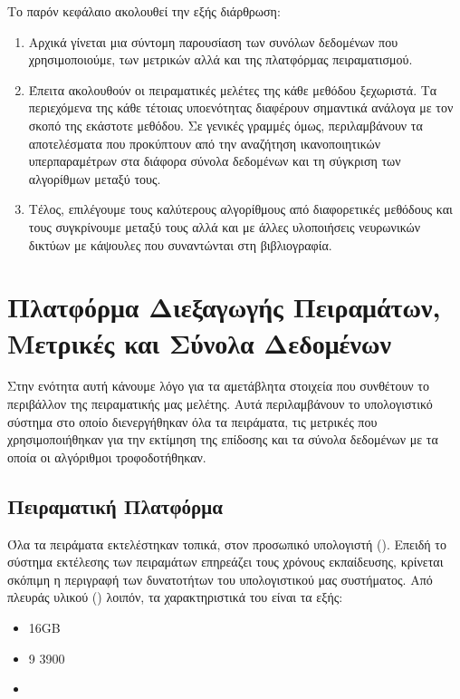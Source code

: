 Το παρόν κεφάλαιο ακολουθεί την εξής διάρθρωση:
\begin{enumerate}
    \item Αρχικά γίνεται μια σύντομη παρουσίαση των συνόλων δεδομένων που χρησιμοποιούμε, των μετρικών αλλά και της πλατφόρμας πειραματισμού.
    \item Έπειτα ακολουθούν οι πειραματικές μελέτες της κάθε μεθόδου ξεχωριστά. Τα περιεχόμενα της κάθε τέτοιας υποενότητας διαφέρουν σημαντικά ανάλογα με τον σκοπό της εκάστοτε μεθόδου. Σε γενικές γραμμές όμως, περιλαμβάνουν τα αποτελέσματα που προκύπτουν από την αναζήτηση ικανοποιητικών υπερπαραμέτρων στα διάφορα σύνολα δεδομένων και τη σύγκριση των αλγορίθμων μεταξύ τους.
    \item Τέλος, επιλέγουμε τους καλύτερους αλγορίθμους από διαφορετικές μεθόδους και τους συγκρίνουμε μεταξύ τους αλλά και με άλλες υλοποιήσεις νευρωνικών δικτύων με κάψουλες που συναντώνται στη βιβλιογραφία.
\end{enumerate}

\section{Πλατφόρμα Διεξαγωγής Πειραμάτων, Μετρικές και Σύνολα Δεδομένων} 
Στην ενότητα αυτή κάνουμε λόγο για τα αμετάβλητα στοιχεία που συνθέτουν το περιβάλλον της πειραματικής μας μελέτης. Αυτά περιλαμβάνουν το υπολογιστικό σύστημα στο οποίο διενεργήθηκαν όλα τα πειράματα, τις μετρικές που χρησιμοποιήθηκαν για την εκτίμηση της επίδοσης και τα σύνολα δεδομένων με τα οποία οι αλγόριθμοι τροφοδοτήθηκαν.
\subsection{Πειραματική Πλατφόρμα}
Όλα τα πειράματα εκτελέστηκαν τοπικά, στον προσωπικό υπολογιστή (). Επειδή το σύστημα εκτέλεσης των πειραμάτων επηρεάζει τους χρόνους εκπαίδευσης, κρίνεται σκόπιμη η περιγραφή των δυνατοτήτων του υπολογιστικού μας συστήματος. Από πλευράς υλικού () λοιπόν, τα χαρακτηριστικά του είναι τα εξής:
\begin{itemize}
    \item 16GB 
    \item {} 9 3900
    \item {}
\end{itemize}

